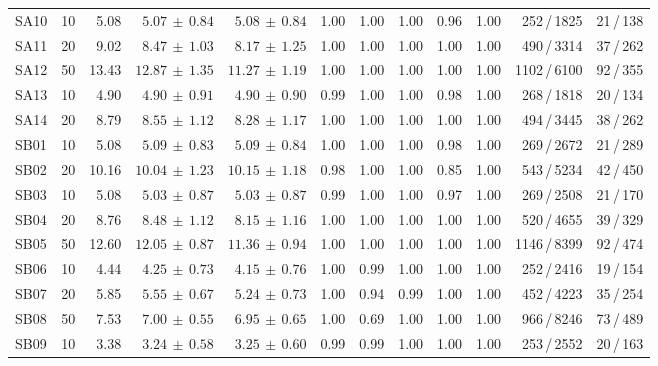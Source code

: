 \begin{table}[htbp]
{\begin{tabular}{l r r r r r r r r r r r}
    SA10 & 10 & 5.08 & $5.07{\scriptstyle\,\pm\,0.84}$ & $5.08{\scriptstyle\,\pm\,0.84}$ & 1.00 & 1.00 & 1.00 & 0.96 & 1.00 & 252\,/\,1825 & 21\,/\,138 \\
    SA11 & 20 & 9.02 & $8.47{\scriptstyle\,\pm\,1.03}$ & $8.17{\scriptstyle\,\pm\,1.25}$ & 1.00 & 1.00 & 1.00 & 1.00 & 1.00 & 490\,/\,3314 & 37\,/\,262 \\
    SA12 & 50 & 13.43 & $12.87{\scriptstyle\,\pm\,1.35}$ & $11.27{\scriptstyle\,\pm\,1.19}$ & 1.00 & 1.00 & 1.00 & 1.00 & 1.00 & 1102\,/\,6100 & 92\,/\,355 \\
    SA13 & 10 & 4.90 & $4.90{\scriptstyle\,\pm\,0.91}$ & $4.90{\scriptstyle\,\pm\,0.90}$ & 0.99 & 1.00 & 1.00 & 0.98 & 1.00 & 268\,/\,1818 & 20\,/\,134 \\
    SA14 & 20 & 8.79 & $8.55{\scriptstyle\,\pm\,1.12}$ & $8.28{\scriptstyle\,\pm\,1.17}$ & 1.00 & 1.00 & 1.00 & 1.00 & 1.00 & 494\,/\,3445 & 38\,/\,262 \\
    \addlinespace
    SB01 & 10 & 5.08 & $5.09{\scriptstyle\,\pm\,0.83}$ & $5.09{\scriptstyle\,\pm\,0.84}$ & 1.00 & 1.00 & 1.00 & 0.98 & 1.00 & 269\,/\,2672 & 21\,/\,289 \\
    SB02 & 20 & 10.16 & $10.04{\scriptstyle\,\pm\,1.23}$ & $10.15{\scriptstyle\,\pm\,1.18}$ & 0.98 & 1.00 & 1.00 & 0.85 & 1.00 & 543\,/\,5234 & 42\,/\,450 \\
    SB03 & 10 & 5.08 & $5.03{\scriptstyle\,\pm\,0.87}$ & $5.03{\scriptstyle\,\pm\,0.87}$ & 0.99 & 1.00 & 1.00 & 0.97 & 1.00 & 269\,/\,2508 & 21\,/\,170 \\
    SB04 & 20 & 8.76 & $8.48{\scriptstyle\,\pm\,1.12}$ & $8.15{\scriptstyle\,\pm\,1.16}$ & 1.00 & 1.00 & 1.00 & 1.00 & 1.00 & 520\,/\,4655 & 39\,/\,329 \\
    SB05 & 50 & 12.60 & $12.05{\scriptstyle\,\pm\,0.87}$ & $11.36{\scriptstyle\,\pm\,0.94}$ & 1.00 & 1.00 & 1.00 & 1.00 & 1.00 & 1146\,/\,8399 & 92\,/\,474 \\
    SB06 & 10 & 4.44 & $4.25{\scriptstyle\,\pm\,0.73}$ & $4.15{\scriptstyle\,\pm\,0.76}$ & 1.00 & 0.99 & 1.00 & 1.00 & 1.00 & 252\,/\,2416 & 19\,/\,154 \\
    SB07 & 20 & 5.85 & $5.55{\scriptstyle\,\pm\,0.67}$ & $5.24{\scriptstyle\,\pm\,0.73}$ & 1.00 & 0.94 & 0.99 & 1.00 & 1.00 & 452\,/\,4223 & 35\,/\,254 \\
    SB08 & 50 & 7.53 & $7.00{\scriptstyle\,\pm\,0.55}$ & $6.95{\scriptstyle\,\pm\,0.65}$ & 1.00 & 0.69 & 1.00 & 1.00 & 1.00 & 966\,/\,8246 & 73\,/\,489 \\
    SB09 & 10 & 3.38 & $3.24{\scriptstyle\,\pm\,0.58}$ & $3.25{\scriptstyle\,\pm\,0.60}$ & 0.99 & 0.99 & 1.00 & 1.00 & 1.00 & 253\,/\,2552 & 20\,/\,163 \\

\end{tabular}}
\end{table}
